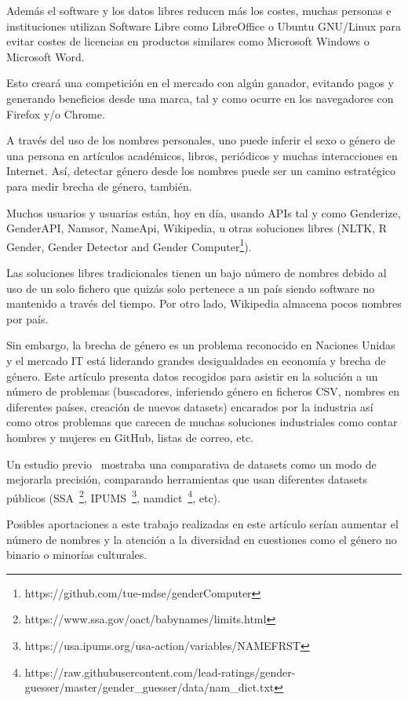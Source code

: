 \documentclass[a4paper]{article}
\begin{document}
Además el software y los datos libres reducen más los costes, muchas personas
e instituciones utilizan Software Libre como LibreOffice o Ubuntu
GNU/Linux para evitar costes de licencias en productos similares
como Microsoft Windows o Microsoft Word.

Esto creará una competición en el mercado con algún ganador, evitando
pagos y generando beneficios desde una marca, tal y como ocurre en los
navegadores con Firefox y/o Chrome.

A través del uso de los nombres personales, uno puede inferir el sexo
o género de una persona en artículos académicos, libros, periódicos y muchas
interacciones en Internet. Así, detectar género desde los nombres puede
ser un camino estratégico para medir brecha de género, también.

Muchos usuarios y usuarias están, hoy en día, usando APIs tal y como
Genderize, GenderAPI, Namsor, NameApi, Wikipedia, u otras soluciones libres
(NLTK\cite{loper2002nltk}, R Gender, Gender Detector and Gender
Computer\footnote{https://github.com/tue-mdse/genderComputer}).

Las soluciones libres tradicionales tienen un bajo número de nombres debido
al uso de un solo fichero que quizás solo pertenece a un país siendo
software no mantenido a través del tiempo. Por otro lado, Wikipedia
almacena pocos nombres por país.

Sin embargo, la brecha de género es un problema reconocido en Naciones
Unidas y el mercado IT está liderando grandes desigualdades en economía
y brecha de género. Este artículo presenta datos recogidos para asistir
en la solución a un número de problemas (buscadores, inferiendo género en
ficheros CSV, nombres en diferentes países, creación de nuevos datasets)
encarados por la industria así como otros problemas que carecen de muchas
soluciones industriales como contar hombres y mujeres en GitHub, listas
de correo, etc.

Un estudio previo~\cite{karimi2016inferring} mostraba una comparativa de
datasets como un modo de mejorarla precisión, comparando herramientas que
usan diferentes datasets públicos
(SSA~\footnote{https://www.ssa.gov/oact/babynames/limits.html},
IPUMS~\footnote{https://usa.ipums.org/usa-action/variables/NAMEFRST},
namdict~\footnote{https://raw.githubusercontent.com/lead-ratings/gender-guesser/master/gender\_guesser/data/nam\_dict.txt},
etc).

Posibles aportaciones a este trabajo realizadas en este artículo
serían aumentar el número de nombres y la atención a la diversidad en
cuestiones como el género no binario o minorías culturales.
\end{document}
